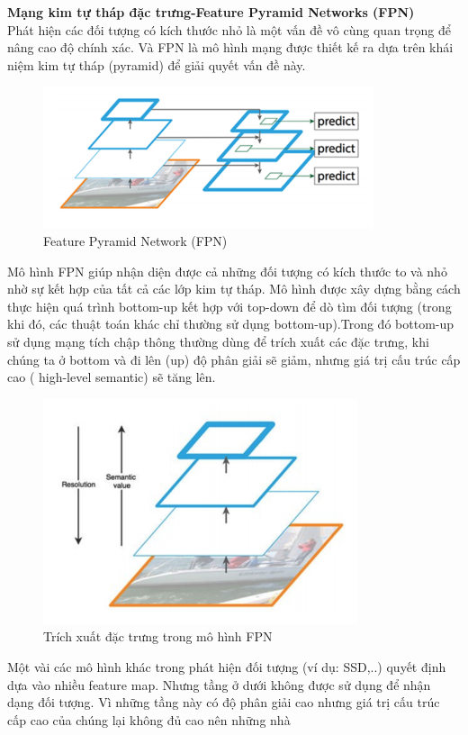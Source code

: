 \documentclass[a4paper, 12pt]{report}
\begin{document}
\textbf{Mạng kim tự tháp đặc trưng-Feature Pyramid Networks (FPN)}  \\
Phát hiện các đối tượng có kích thước nhỏ là một vấn đề vô cùng quan trọng để nâng cao độ chính xác. Và FPN \cite{cfpn} là mô hình mạng được thiết kế
ra dựa trên khái niệm kim tự tháp (pyramid) để giải quyết vấn đề này. \\
\begin{figure}[!h]
	\centering
	\includegraphics[width=0.5\linewidth]{Images/fpn1}
	\caption{Feature Pyramid Network (FPN)}
	\label{fig:resnet-fpn1}
\end{figure}
\hspace*{1cm}Mô hình FPN giúp nhận diện được cả những đối tượng có kích thước
to và nhỏ nhờ sự kết hợp của tất cả các lớp kim tự tháp. Mô hình được
xây dựng bằng cách thực hiện quá trình bottom-up kết hợp với top-down
để dò tìm đối tượng (trong khi đó, các thuật toán khác chỉ thường sử dụng
bottom-up).Trong đó bottom-up sử dụng mạng tích chập thông thường
dùng để trích xuất các đặc trưng, khi chúng ta ở bottom và đi lên (up) độ
phân giải sẽ giảm, nhưng giá trị cấu trúc cấp cao ( high-level semantic) sẽ
tăng lên. \\
\begin{figure}[!h]
	\centering
	\includegraphics[width=0.5\linewidth]{Images/fpn2}
	\caption{Trích xuất đặc trưng trong mô hình FPN}
	\label{fig:resnet-fpn2}
\end{figure}
\hspace*{1cm}Một vài các mô hình khác trong phát hiện đối tượng (ví dụ: SSD,..)
quyết định dựa vào nhiều feature map. Nhưng tầng ở dưới không được
sử dụng để nhận dạng đối tượng. Vì những tầng này có độ phân giải cao
nhưng giá trị cấu trúc cấp cao của chúng lại không đủ cao nên những nhà
\end{document}
